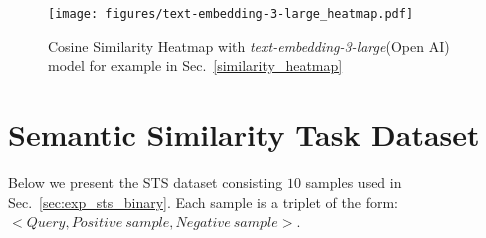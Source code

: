 \begin{figure*}[h!]
  \centering
  \texttt{[image: figures/text-embedding-3-large\_heatmap.pdf]}
  \caption{Cosine Similarity Heatmap with \textit{text-embedding-3-large}(Open AI) model for example in Sec.~\ref{similarity_heatmap}   \label{fig:heatmap_openai}}
\end{figure*}



   \clearpage

   
\section{Semantic Similarity Task Dataset}
Below we present the STS dataset consisting $10$ samples used in Sec.~\ref{sec:exp_sts_binary}. Each sample is  a triplet of the form: \\ $< Query, Positive\ sample, Negative\ sample >$.
\label{sec:dataset_sts}


